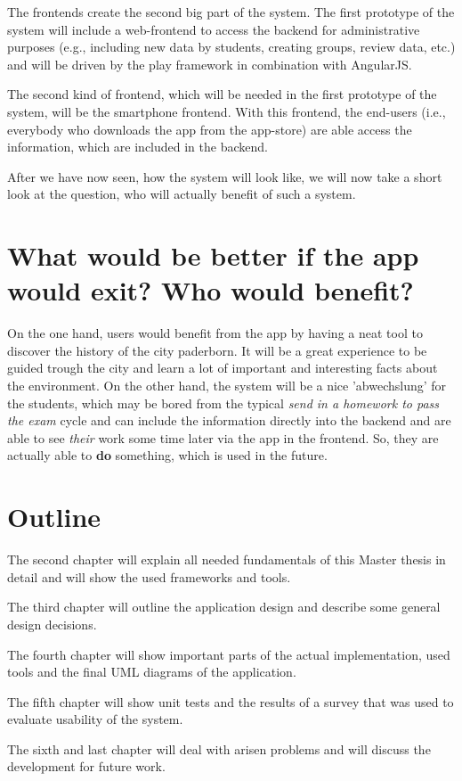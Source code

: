 The frontends create the second big part of the system. The first prototype of the system will include a web-frontend to access the backend for administrative purposes (e.g., including new data by students, creating groups, review data, etc.) and will be driven by the play framework in combination with AngularJS. 

The second kind of frontend, which will be needed in the first prototype of the system, will be the smartphone frontend. With this frontend, the end-users (i.e., everybody who downloads the app from the app-store) are able access the information, which are included in the backend.

After we have now seen, how the system will look like, we will now take a short look at the question, who will actually benefit of such a system.   

\section{What would be better if the app would exit? Who would benefit?}
On the one hand, users would benefit from the app by having a neat tool to discover the history of the city paderborn. It will be a great experience to be guided trough the city and learn a lot of important and interesting facts about the environment. 
On the other hand, the system will be a nice 'abwechslung'  for the students, which may be bored from the typical \textit{send in a homework to pass the exam} cycle and can include the information directly into the backend and are able to see \textit{their} work some time later via the app in the frontend. So, they are actually able to \textbf{do} something, which is used in the future.    

\section{Outline}
The second chapter will explain all needed fundamentals of this Master thesis in detail and will show the used frameworks and tools.

The third chapter will outline the application design and describe some general design decisions.

The fourth chapter will show important parts of the actual implementation, used tools and the final \acf{UML} diagrams of the application.

The fifth chapter will show unit tests and the results of a survey that was used to evaluate usability of the system. 

The sixth and last chapter will deal with arisen problems and will discuss the development for future work.
